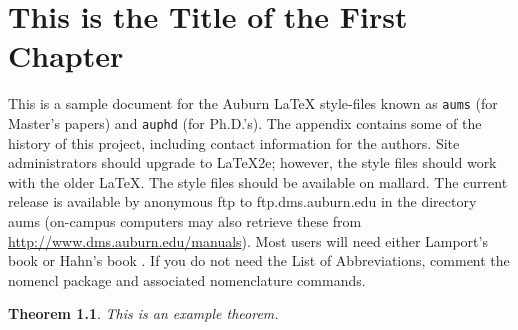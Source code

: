 \documentclass[12pt]{report}
\newtheorem{theorem}{Theorem}[chapter]
\begin{document}
\normalem       %


\chapter{\normalsize This is the Title of the First Chapter}  %
This is a sample document for the Auburn \LaTeX{} style-files known
as {\tt aums} (for Master's papers) and {\tt auphd} (for Ph.D.'s).
The appendix contains some of the history of this project, including
contact information for the authors. 
Site administrators should upgrade to \LaTeX2e; however, the style files
should work with the older \LaTeX.  \vfill The style files should be available
on mallard.  The current release is available by anonymous ftp to
ftp.dms.auburn.edu in the directory aums (on-campus computers may
also retrieve these from \url{http://www.dms.auburn.edu/manuals}).
Most users will need either Lamport's book \cite{lamport} or Hahn's book
\cite{hahn}.%
If you do not need the List of Abbreviations, comment the nomencl package and associated nomenclature commands. 
\begin{theorem} This is an example theorem.
\end{theorem}%
\end{document}
